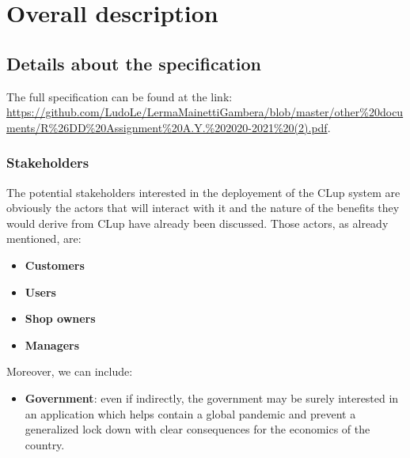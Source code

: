 \section{Overall description}
\label{sect:overalldescription}



\subsection{Details about the specification}
\label{subsect:furtherdetailsaboutspecification}

The full specification can be found at the link: \url{https://github.com/LudoLe/LermaMainettiGambera/blob/master/other%20documents/R%26DD%20Assignment%20A.Y.%202020-2021%20(2).pdf}.
\label{specification}

\subsubsection{Stakeholders}
\label{subsubsect:stakeholders}

The potential stakeholders interested in the deployement of the CLup system are obviously the actors that will interact with it and the nature of the benefits they would derive from CLup have already been discussed. Those actors, as already mentioned, are:
\begin{itemize}[topsep=0pt]
    \item \textbf{Customers}
    \item \textbf{Users}
    \item \textbf{Shop owners}
    \item \textbf{Managers}
\end{itemize}
Moreover, we can include:
\begin{itemize}[topsep=0pt]
    \item \textbf{Government}: even if indirectly, the government may be surely interested in an application which helps contain a global pandemic and prevent a generalized lock down with clear consequences for the economics of the country.
\end{itemize}

